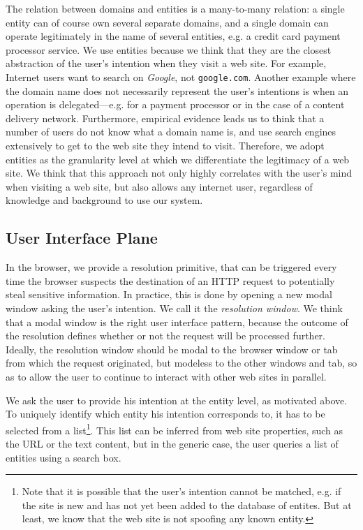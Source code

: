 \documentclass[11pt,styles/chicago]{article}
\begin{document}
The relation between domains and entities is a many-to-many relation: a single entity can of course own several separate domains, and a single domain can operate legitimately in the name of several entities, e.g. a credit card payment processor service. We use entities because we think that they are the closest abstraction of the user's intention when they visit a web site. For example, Internet users want to search on \emph{Google}, not \texttt{google.com}. Another example where the domain name does not necessarily represent the user's intentions is when an operation is delegated---e.g. for a payment processor or in the case of a content delivery network. Furthermore, empirical evidence \cite{facebooklogin} leads us to think that a number of users do not know what a domain name is, and use search engines extensively to get to the web site they intend to visit. Therefore, we adopt entities as the granularity level at which we differentiate the legitimacy of a web site. We think that this approach not only highly correlates with the user's mind when visiting a web site, but also allows any internet user, regardless of knowledge and background to use our system. %

\subsection{User Interface Plane}

In the browser, we provide a resolution primitive, that can be triggered every time the browser suspects the destination of an HTTP request to potentially steal sensitive information. In practice, this is done by opening a new modal window asking the user's intention. We call it the \emph{resolution window}. We think that a modal window is the right user interface pattern, because the outcome of the resolution defines whether or not the request will be processed further. Ideally, the resolution window should be modal to the browser window or tab from which the request originated, but modeless to the other windows and tab, so as to allow the user to continue to interact with other web sites in parallel.

We ask the user to provide his intention at the entity level, as motivated above. To uniquely identify which entity his intention corresponds to, it has to be selected from a list\footnote{Note that it is possible that the user's intention cannot be matched, e.g. if the site is new and has not yet been added to the database of entites. But at least, we know that the web site is not spoofing any known entity.}. This list can be inferred from web site properties, such as the URL or the text content, but in the generic case, the user queries a list of entities using a search box.
\end{document}
